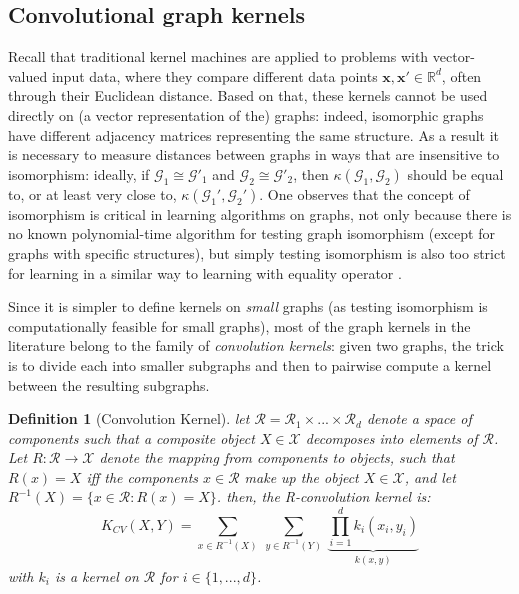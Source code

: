 \subsection{Convolutional graph kernels}
Recall that traditional kernel machines are applied to problems with vector-valued input data, where they compare different data points $\mathbf{x},\mathbf{x}' \in \mathbb{R}^d$, often through their Euclidean distance. Based on that, these kernels cannot be used directly on (a vector representation of the) graphs: indeed, isomorphic graphs have different adjacency matrices representing the same structure. As a result it is necessary to measure distances between graphs in ways that are insensitive to isomorphism: ideally, if $\mathcal{G}_1 \cong \mathcal{G}'_1$ and $\mathcal{G}_2 \cong \mathcal{G}'_2$, then $\kappa(\mathcal{G}_1, \mathcal{G}_2)$ should be equal to, or at least very close to, $\kappa(\mathcal{G}_1', \mathcal{G}_2')$. One observes that the concept of isomorphism is critical in learning algorithms on graphs, not only because there is no known polynomial-time algorithm for testing graph isomorphism (except for graphs with specific structures), but simply testing isomorphism is also too strict for learning in a similar way to learning with equality operator  \citep{kriege_graph_kernels}.

Since it is simpler to define kernels on \emph{small} graphs (as testing isomorphism is computationally feasible for small graphs), most of the graph kernels in the literature belong to the family of \emph{convolution kernels}: given two graphs, the trick is to divide each into smaller subgraphs and then to pairwise compute a kernel between the resulting subgraphs.
\newtheorem{definition}{Definition} 
\begin{definition}[Convolution Kernel]
	let $\mathcal{R}=\mathcal{R}_1\times...\times \mathcal{R}_d$ denote a space of components such that a composite object $X\in \mathcal{X}$ decomposes into elements of $\mathcal{R}$. Let $R:\mathcal{R}\xrightarrow{}\mathcal{X}$ denote the mapping from components to objects, such that $R(x)=X$ iff the components $x\in \mathcal{R}$ make up the object $X\in \mathcal{X}$, and let $R^{-1}(X)=\{x\in\mathcal{R}:R(x)=X\}$. then, the R-convolution kernel is:
	\begin{equation}
	\label{eq:conolutional_kernels}
	K_{CV}(X,Y)=\sum_{x\in R^{-1}(X)}~\sum_{y\in R^{-1}(Y)}~\underbrace{\prod_{i=1}^{d}k_i(x_i,y_i)}_{k(x,y)}
	\end{equation}
	with $k_i$ is a kernel on $\mathcal{R}$ for $i\in\{1,...,d\}$.
\end{definition}

